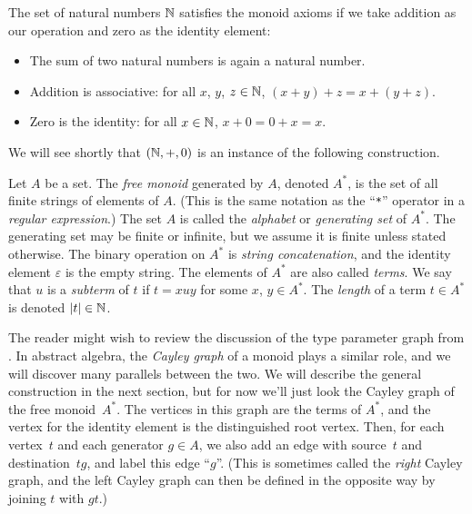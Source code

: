 \documentclass[../generics]{subfiles}
\begin{document}
\begin{example}
The set of natural numbers $\mathbb{N}$ satisfies the monoid axioms if we take addition as our operation and zero as the identity element:
\begin{itemize}
\item The sum of two natural numbers is again a natural number.
\item Addition is associative: for all $x$, $y$, $z\in\mathbb{N}$, $(x+y)+z=x+(y+z)$.
\item Zero is the identity: for all $x\in\mathbb{N}$, $x+0=0+x=x$.
\end{itemize}
\end{example}

We will see shortly that $(\mathbb{N},+,0)$ is an instance of the following construction.

\begin{definition}
Let $A$ be a set. The \emph{free monoid} generated by $A$, denoted $A^*$, is the set of all finite strings of elements of $A$. (This is the same notation as the ``\texttt{*}'' operator in a \emph{regular expression}.) The set $A$ is called the \emph{alphabet} or \emph{generating set} of $A^*$. The generating set may be finite or infinite, but we assume it is finite unless stated otherwise. The binary operation on $A^*$ is \emph{string concatenation}, and the identity element $\varepsilon$ is the empty string. The elements of $A^*$ are also called \emph{terms}. We say that $u$ is a \emph{subterm} of $t$ if $t=xuy$ for some $x$, $y\in A^*$. The \emph{length} of a term $t\in A^*$ is denoted $|t|\in\mathbb{N}$.
\end{definition}

The reader might wish to review the discussion of the type parameter graph from . In abstract algebra, the \emph{Cayley graph} of a monoid plays a similar role, and we will discover many parallels between the two. We will describe the general construction in the next section, but for now we'll just look the Cayley graph of the free monoid~$A^*$. The vertices in this graph are the terms of $A^*$, and the vertex for the identity element is the distinguished root vertex. Then, for each vertex~$t$ and each generator $g\in A$, we also add an edge with source~$t$ and destination~$tg$, and label this edge ``$g$''. (This is sometimes called the \emph{right} Cayley graph, and the left Cayley graph can then be defined in the opposite way by joining $t$ with $gt$.)
\end{document}
